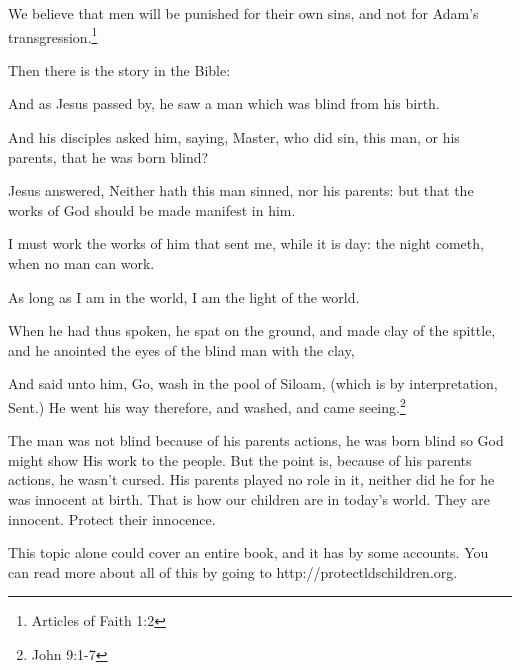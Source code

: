 \begin{displayquote}
We believe that men will be punished for their own sins, and not for Adam's 
transgression.\footnote{Articles of Faith 1:2}
\end{displayquote}

Then there is the story in the Bible:

\begin{displayquote}
And as Jesus passed by, he saw a man which was blind from his birth.

And his disciples asked him, saying, Master, who did sin, this man, or his parents, 
that he was born blind?

Jesus answered, Neither hath this man sinned, nor his parents: but that the works of 
God should be made manifest in him.

I must work the works of him that sent me, while it is day: the night cometh, 
when no man can work.

As long as I am in the world, I am the light of the world.

When he had thus spoken, he spat on the ground, and made clay of the spittle, 
and he anointed the eyes of the blind man with the clay,

And said unto him, Go, wash in the pool of Siloam, (which is by interpretation, 
  Sent.) He went his way therefore, and washed, and came seeing.\footnote{John 9:1-7}
\end{displayquote}

The man was not blind because of his parents actions, he was born blind so God might
show His work to the people. But the point is, because of his parents actions, he
wasn't cursed. His parents played no role in it, neither did he for he was innocent
at birth. That is how our children are in today's world. They are innocent. Protect
their innocence.

This topic alone could cover an entire book, and it has by some accounts. You can
read more about all of this by going to http://protectldschildren.org.